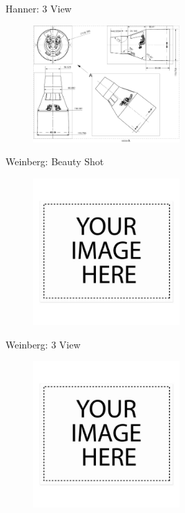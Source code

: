 \documentclass[10pt]{beamer}
\begin{document}
\begin{frame}{Hanner: 3 View}
\begin{figure}
\centering
\includegraphics[width=0.5\textwidth]{Hanner_3_View.png}
\end{figure}
\end{frame}

	\begin{frame}{Weinberg: Beauty Shot}
\begin{figure}
	\centering
	\includegraphics[width=0.5\textwidth]{Weinberg_Beauty.png}
\end{figure}
\end{frame}

\begin{frame}{Weinberg: 3 View}
\begin{figure}
\centering
\includegraphics[width=0.5\textwidth]{Weinberg_3_View.png}
\end{figure}
\end{frame}
\end{document}
